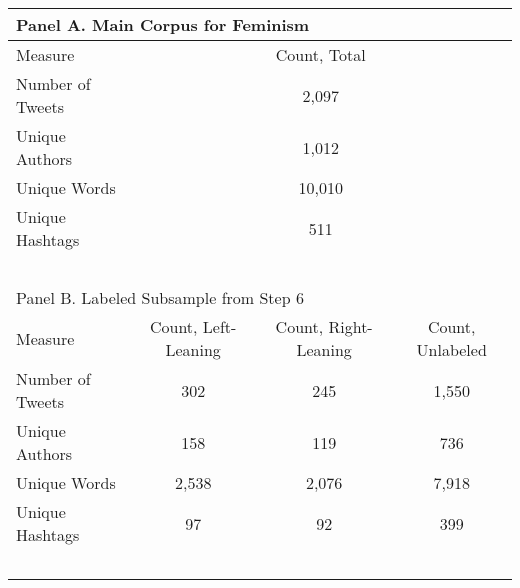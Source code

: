 %
    
    \centering
    \begin{tabular}{l|c|c|c}
        \toprule\toprule
            \multicolumn{4}{l}{Panel A. Main Corpus for Feminism} \\ 
        \midrule
            Measure & \multicolumn{3}{c}{Count, Total} \\ \hline
            Number of Tweets & \multicolumn{3}{c}{2,097} \\ 
            Unique Authors & \multicolumn{3}{c}{1,012} \\ 
            Unique Words & \multicolumn{3}{c}{10,010} \\ 
            Unique Hashtags & \multicolumn{3}{c}{511} \\ 
            ~ & \multicolumn{3}{c}{} \\
            
        \toprule
            \multicolumn{4}{l}{Panel B. Labeled Subsample from Step 6} \\ 
        \midrule
            Measure & Count, Left-Leaning & Count, Right-Leaning & Count, Unlabeled \\ \hline
            Number of Tweets & 302 & 245 & 1,550 \\ 
            Unique Authors & 158 & 119 & 736 \\ 
            Unique Words & 2,538 & 2,076 & 7,918 \\ 
            Unique Hashtags & 97 & 92 & 399 \\
            ~ & ~ & ~ & ~ \\
        \bottomrule\bottomrule
    \end{tabular}

%